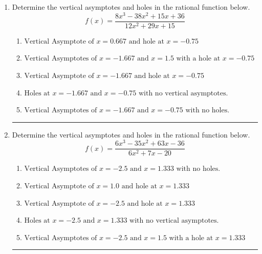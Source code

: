\documentclass[14pt]{extbook}
\newcommand{\litem}[1]{\item#1\hspace*{-1cm}\rule{\textwidth}{0.4pt}}
\begin{document}
\begin{enumerate}
{\begin{enumerate}[label=\Alph*.]
\end{enumerate} }
\litem{
Determine the vertical asymptotes and holes in the rational function below.\[ f(x) = \frac{8x^{3} -38 x^{2} +15 x + 36}{12x^{2} +29 x + 15} \]\begin{enumerate}[label=\Alph*.]
\item \( \text{Vertical Asymptote of } x = 0.667 \text{ and hole at } x = -0.75 \)
\item \( \text{Vertical Asymptotes of } x = -1.667 \text{ and } x = 1.5 \text{ with a hole at } x = -0.75 \)
\item \( \text{Vertical Asymptote of } x = -1.667 \text{ and hole at } x = -0.75 \)
\item \( \text{Holes at } x = -1.667 \text{ and } x = -0.75 \text{ with no vertical asymptotes.} \)
\item \( \text{Vertical Asymptotes of } x = -1.667 \text{ and } x = -0.75 \text{ with no holes.} \)

\end{enumerate} }
\litem{
Determine the vertical asymptotes and holes in the rational function below.\[ f(x) = \frac{6x^{3} -35 x^{2} +63 x -36}{6x^{2} +7 x -20} \]\begin{enumerate}[label=\Alph*.]
\item \( \text{Vertical Asymptotes of } x = -2.5 \text{ and } x = 1.333 \text{ with no holes.} \)
\item \( \text{Vertical Asymptote of } x = 1.0 \text{ and hole at } x = 1.333 \)
\item \( \text{Vertical Asymptote of } x = -2.5 \text{ and hole at } x = 1.333 \)
\item \( \text{Holes at } x = -2.5 \text{ and } x = 1.333 \text{ with no vertical asymptotes.} \)
\item \( \text{Vertical Asymptotes of } x = -2.5 \text{ and } x = 1.5 \text{ with a hole at } x = 1.333 \)


\end{enumerate}}
\end{enumerate}
\end{document}
